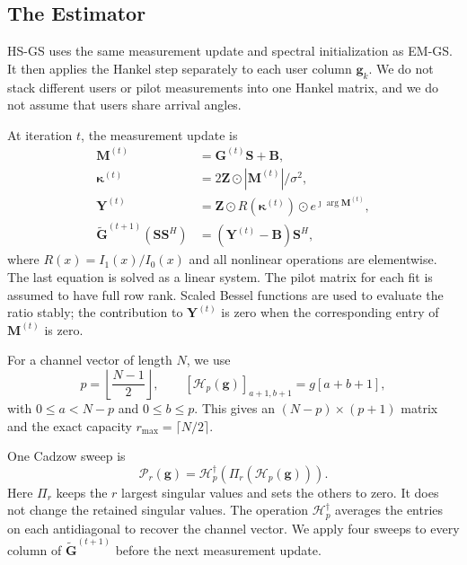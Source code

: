 \documentclass[journal]{IEEEtran}
\begin{document}
\subsection{The Estimator}
\label{sec:revised-estimator}

HS-GS uses the same measurement update and spectral initialization as
EM-GS. It then applies the Hankel step separately to each user column
$\mathbf g_k$. We do not stack different users or pilot measurements into
one Hankel matrix, and we do not assume that users share arrival angles.

At iteration $t$, the measurement update is
\begin{align}
\mathbf M^{(t)}&=\mathbf G^{(t)}\mathbf S+\mathbf B,\\
\boldsymbol\kappa^{(t)}&=
  2\mathbf Z\odot|\mathbf M^{(t)}|/\sigma^2,\\
\mathbf Y^{(t)}&=\mathbf Z\odot R(\boldsymbol\kappa^{(t)})
  \odot e^{\jmath\arg\mathbf M^{(t)}},\\
\widetilde{\mathbf G}^{(t+1)}(\mathbf S\mathbf S^H)
  &=(\mathbf Y^{(t)}-\mathbf B)\mathbf S^H,
\label{eq:revision-em-update}
\end{align}
where $R(x)=I_1(x)/I_0(x)$ and all nonlinear operations are elementwise.
The last equation is solved as a linear system. The pilot matrix for each
fit is assumed to have full row rank. Scaled Bessel functions are used to
evaluate the ratio stably; the contribution to $\mathbf Y^{(t)}$ is zero
when the corresponding entry of $\mathbf M^{(t)}$ is zero.

For a channel vector of length $N$, we use
\begin{equation}
p=\left\lfloor\frac{N-1}{2}\right\rfloor,
\qquad
[\mathcal H_p(\mathbf g)]_{a+1,b+1}=g[a+b+1],
\end{equation}
with $0\leq a<N-p$ and $0\leq b\leq p$. This gives an
$(N-p)\times(p+1)$ matrix and the exact capacity
$r_{\max}=\lceil N/2\rceil$.

One Cadzow sweep is
\begin{equation}
\mathcal P_r(\mathbf g)=
\mathcal H_p^\dagger\!\left(\Pi_r(\mathcal H_p(\mathbf g))\right).
\label{eq:revision-cadzow}
\end{equation}
Here $\Pi_r$ keeps the $r$ largest singular values and sets the others to
zero. It does not change the retained singular values. The operation
$\mathcal H_p^\dagger$ averages the entries on each antidiagonal to recover
the channel vector. We apply four sweeps to every column of
$\widetilde{\mathbf G}^{(t+1)}$ before the next measurement update.
\end{document}
